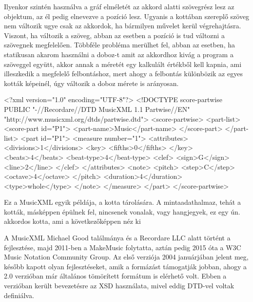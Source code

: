 Ilyenkor szintén használva a gráf elméletét az akkord alatti szövegrész lesz az objektum, az él pedig elnevezve a pozíció lesz. Ugyanis a kottában szereplő szöveg nem változik ugye csak az akkordok, ha bármilyen művelet kerül végrehajtásra. Viszont, ha változik a szöveg, abban az esetben a pozíció is tud változni a szövegnek megfelelően. Többféle probléma merülhet fel, abban az esetben, ha statikusan akarom használni a doboz-t amit az akkordhoz kivág a program a szöveggel együtt, akkor annak a méretét egy kalkulált értékből kell kapnia, ami illeszkedik a megfelelő felbontáshoz, mert ahogy a felbontás különbözik az egyes kották képeinél, úgy változik a doboz mérete is arányosan.
\newpage
{}
\begin{xml}
<?xml version="1.0" encoding="UTF-8"?>
<!DOCTYPE score-partwise PUBLIC "-//Recordare//DTD MusicXML 1.1 Partwise//EN" "http://www.musicxml.org/dtds/partwise.dtd">
<score-partwise>
   <part-list>
      <score-part id="P1">
         <part-name>Music</part-name>
      </score-part>
   </part-list>
   <part id="P1">
      <measure number="1">
         <attributes>
            <divisions>1</divisions>
            <key>
               <fifths>0</fifths>
            </key>
            <beats>4</beats>
            <beat-type>4</beat-type>
            <clef>
               <sign>G</sign>
               <line>2</line>
            </clef>
         </attributes>
         <note>
            <pitch>
               <step>C</step>
               <octave>4</octave>
            </pitch>
            <duration>4</duration>
            <type>whole</type>
         </note>
      </measure>
   </part>
</score-partwise>
\end{xml}

Ez a MusicXML egyik példája, a kotta tárolására. A mintaadathalmaz, tehát a kották, másképpen épülnek fel, nincsenek vonalak, vagy hangjegyek, ez egy ún. akkordos kotta, ami a következőképpen néz ki

\cite{enwiki:1065665260}
A MusicXML Michael Good találmánya és a Recordare LLC alatt történt a fejlesztése, majd 2011-ben a MakeMusic folytatta, aztán pedig 2015 óta a W3C Music Notation Community Group. Az első verziója 2004 januárjában jelent meg, később kapott olyan fejlesztéseket, amik a formázást támogatják jobban, ahogy a 2.0 verzióban már általános tömörített formátum is elérhető volt. Ebben a verzióban került bevezetésre az XSD használata, mivel eddig DTD-vel voltak definiálva.

